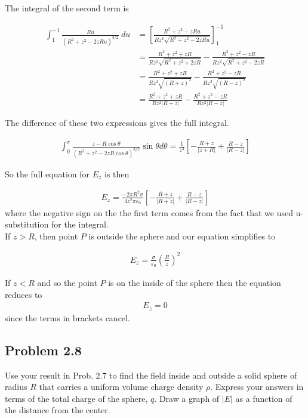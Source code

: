 \documentclass{article}
\begin{document}
The integral of the second term is 

\begin{align*}
    \int_{1}^{-1}\frac{Ru}{(R^2 + z^2 - 2zRu)^{3/2}}\ du &= \left[ \frac{R^2 + z^2 - zRu}{Rz^2\sqrt{R^2 + z^2 - 2zRu}} \right]^{-1}_{1} \\
    &= \frac{R^2 + z^2 + zR}{Rz^2\sqrt{R^2 + z^2 + 2zR}} - \frac{R^2 + z^2 - zR}{Rz^2\sqrt{R^2 + z^2 - 2zR}} \\
    &= \frac{R^2 + z^2 + zR}{Rz^2\sqrt{(R + z)^2}} - \frac{R^2 + z^2 - zR}{Rz^2\sqrt{(R - z)^2}} \\
    &= \frac{R^2 + z^2 + zR}{Rz^2 |R + z|} - \frac{R^2 + z^2 - zR}{Rz^2|R - z|}
\end{align*}

The difference of these two expressions gives the full integral.

\begin{align*}
\int_0^{\pi} \frac{z - R\cos \theta}{(R^2 + z^2 - 2zR\cos\theta)^{3/2}} \sin \theta d\theta = \frac{1}{z^2}\left[ -\frac{R + z}{|z + R|} + \frac{R - z}{|R - z|} \right]
\end{align*}

So the full equation for $E_z$ is then 

\begin{align*}
    E_z = \frac{-2\pi R^2\sigma}{4z^2\pi\varepsilon_0}\left[ -\frac{R + z}{|R + z|} + \frac{R - z}{|R - z|} \right]
\end{align*}
where the negative sign on the the first term comes from the fact that we used u-substitution for the integral.\\

If $z > R$, then point $P$ is outside the sphere and our equation simplifies to

\begin{align*}
    E_z = \frac{\sigma}{\varepsilon_0}\left(\frac{R}{z}\right)^2
\end{align*}

If $z < R$ and so the point $P$ is on the inside of the sphere then the equation reduces to 
\begin{align*}
    E_z = 0
\end{align*}
since the terms in brackets cancel.

\newpage

\subsection*{Problem 2.8}
Use your result in Prob. 2.7 to find the field inside and outside a solid
sphere of radius $R$ that carries a uniform volume charge density $\rho$. Express your answers in terms of the total charge of the sphere, $q$. Draw a graph of $|E|$ as a function of the distance from the center.
\end{document}
